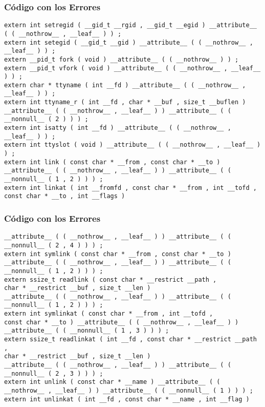 \documentclass{beamer}
\begin{document}
\begin{frame}[fragile]
\frametitle{C\'odigo con los Errores}
\begin{lstlisting}[style=CStyle]
extern int setregid ( __gid_t __rgid , __gid_t __egid ) __attribute__ ( ( __nothrow__ , __leaf__ ) ) ; 
extern int setegid ( __gid_t __gid ) __attribute__ ( ( __nothrow__ , __leaf__ ) ) ; 
extern __pid_t fork ( void ) __attribute__ ( ( __nothrow__ ) ) ; 
extern __pid_t vfork ( void ) __attribute__ ( ( __nothrow__ , __leaf__ ) ) ; 
extern char * ttyname ( int __fd ) __attribute__ ( ( __nothrow__ , __leaf__ ) ) ; 
extern int ttyname_r ( int __fd , char * __buf , size_t __buflen ) 
__attribute__ ( ( __nothrow__ , __leaf__ ) ) __attribute__ ( ( __nonnull__ ( 2 ) ) ) ; 
extern int isatty ( int __fd ) __attribute__ ( ( __nothrow__ , __leaf__ ) ) ; 
extern int ttyslot ( void ) __attribute__ ( ( __nothrow__ , __leaf__ ) ) ; 
extern int link ( const char * __from , const char * __to ) 
__attribute__ ( ( __nothrow__ , __leaf__ ) ) __attribute__ ( ( __nonnull__ ( 1 , 2 ) ) ) ; 
extern int linkat ( int __fromfd , const char * __from , int __tofd , 
const char * __to , int __flags ) 
\end{lstlisting}
\end{frame}
\begin{frame}[fragile]
\frametitle{C\'odigo con los Errores}
\begin{lstlisting}[style=CStyle]
__attribute__ ( ( __nothrow__ , __leaf__ ) ) __attribute__ ( ( __nonnull__ ( 2 , 4 ) ) ) ; 
extern int symlink ( const char * __from , const char * __to ) 
__attribute__ ( ( __nothrow__ , __leaf__ ) ) __attribute__ ( ( __nonnull__ ( 1 , 2 ) ) ) ; 
extern ssize_t readlink ( const char * __restrict __path , 
char * __restrict __buf , size_t __len ) 
__attribute__ ( ( __nothrow__ , __leaf__ ) ) __attribute__ ( ( __nonnull__ ( 1 , 2 ) ) ) ; 
extern int symlinkat ( const char * __from , int __tofd , 
const char * __to ) __attribute__ ( ( __nothrow__ , __leaf__ ) ) __attribute__ ( ( __nonnull__ ( 1 , 3 ) ) ) ; 
extern ssize_t readlinkat ( int __fd , const char * __restrict __path , 
char * __restrict __buf , size_t __len ) 
__attribute__ ( ( __nothrow__ , __leaf__ ) ) __attribute__ ( ( __nonnull__ ( 2 , 3 ) ) ) ; 
extern int unlink ( const char * __name ) __attribute__ ( ( __nothrow__ , __leaf__ ) ) __attribute__ ( ( __nonnull__ ( 1 ) ) ) ; 
extern int unlinkat ( int __fd , const char * __name , int __flag ) 
\end{lstlisting}
\end{frame}
\end{document}
